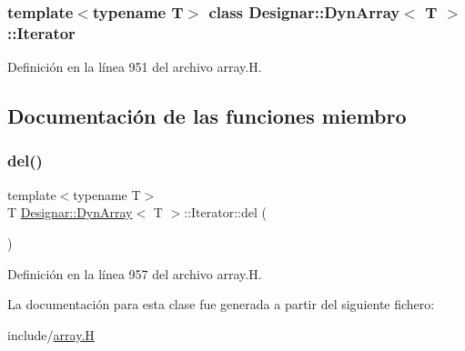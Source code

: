 \subsubsection*{template$<$typename T$>$\newline
class Designar\+::\+Dyn\+Array$<$ T $>$\+::\+Iterator}



Definición en la línea 951 del archivo array.\+H.



\subsection{Documentación de las funciones miembro}
\mbox{\label{class_designar_1_1_dyn_array_1_1_iterator_a3d700006f23d3c4b63e109edef32410f}} 
\subsubsection{\texorpdfstring{del()}{del()}}
{\footnotesize\ttfamily template$<$typename T$>$ \\
T \hyperlink{class_designar_1_1_dyn_array}{Designar\+::\+Dyn\+Array}$<$ T $>$\+::Iterator\+::del (\begin{DoxyParamCaption}{ }\end{DoxyParamCaption})\hspace{0.3cm}{\ttfamily [inline]}}



Definición en la línea 957 del archivo array.\+H.



La documentación para esta clase fue generada a partir del siguiente fichero\+:\begin{DoxyCompactItemize}
\item 
include/\hyperlink{array_8_h}{array.\+H}\end{DoxyCompactItemize}
